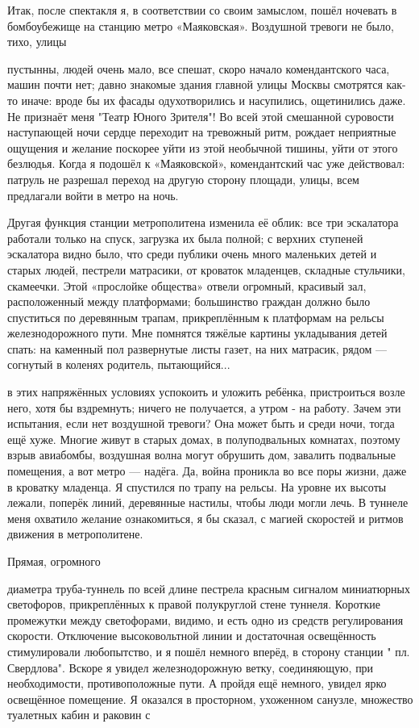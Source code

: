 Итак, после спектакля я, в соответствии со своим замыслом, пошёл ночевать в бомбоубежище на станцию метро «Маяковская». Воздушной тревоги не было, тихо, улицы

\label{236-1}
пустынны, людей очень мало, все спешат, скоро начало комендантского часа, машин почти нет; давно знакомые здания главной улицы Москвы смотрятся как-то иначе: вроде бы их фасады одухотворились и насупились, ощетинились даже. Не признаёт меня "Театр Юного Зрителя"! Во всей этой смешанной суровости наступающей ночи сердце переходит на тревожный ритм, рождает неприятные ощущения и желание поскорее уйти из этой необычной тишины, уйти от этого безлюдья. Когда я подошёл к «Маяковской», комендантский час уже действовал: патруль не разрешал переход на другую сторону площади, улицы, всем предлагали войти в метро на ночь.

\label{237-1}
Другая функция станции метрополитена изменила её облик: все три эскалатора работали только на спуск, загрузка их была полной; с верхних ступеней эскалатора видно было, что среди публики очень много маленьких детей и старых людей, пестрели матрасики, от кроваток младенцев, складные стульчики, скамеечки. Этой «прослойке общества» отвели огромный, красивый зал, расположенный между платформами; большинство граждан должно было спуститься по деревянным трапам, прикреплённым к платформам на рельсы железнодорожного пути. Мне помнятся тяжёлые картины укладывания детей спать: на каменный пол развернутые листы газет, на них матрасик, рядом — согнутый в коленях родитель, пытающийся...

\label{238-1}
в этих напряжённых условиях успокоить и уложить ребёнка, пристроиться возле него, хотя бы вздремнуть; ничего не получается, а утром - на работу. Зачем эти испытания, если нет воздушной тревоги? Она может быть и среди ночи, тогда ещё хуже. Многие живут в старых домах, в полуподвальных комнатах, поэтому взрыв авиабомбы, воздушная волна могут обрушить дом, завалить подвальные помещения, а вот метро — надёга. Да, война проникла во все поры жизни, даже в кроватку младенца. Я спустился по трапу на рельсы. На уровне их высоты лежали, поперёк линий, деревянные настилы, чтобы люди могли лечь. В туннеле меня охватило желание ознакомиться, я бы сказал, с магией скоростей и ритмов движения в метрополитене.

Прямая, огромного

\label{239-1}
 диаметра труба-туннель по всей длине пестрела красным сигналом миниатюрных светофоров, прикреплённых к правой полукруглой стене туннеля. Короткие промежутки между светофорами, видимо, и есть одно из средств регулирования скорости. Отключение высоковольтной линии и достаточная освещённость стимулировали любопытство, и я пошёл немного вперёд, в сторону станции " пл. Свердлова". Вскоре я увидел железнодорожную ветку, соединяющую, при необходимости, противоположные пути. А пройдя ещё немного, увидел ярко освещённое помещение. Я оказался в просторном, ухоженном санузле, множество туалетных кабин и раковин с

